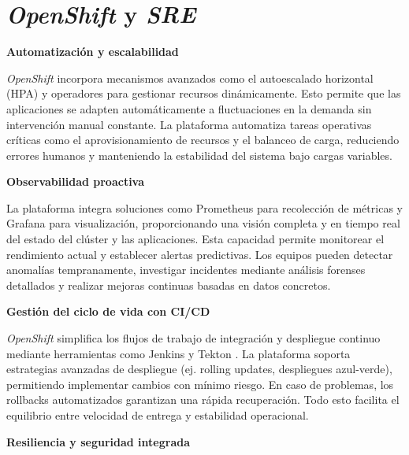 \newpage
\section{\textit{OpenShift} y \textit{SRE}}

\vspace{0.5cm}
\noindent\textbf{Automatización y escalabilidad}

\textit{OpenShift} incorpora mecanismos avanzados como el autoescalado horizontal (HPA) y operadores para gestionar recursos dinámicamente. Esto permite que las aplicaciones se adapten automáticamente a fluctuaciones en la demanda sin intervención manual constante. La plataforma automatiza tareas operativas críticas como el aprovisionamiento de recursos y el balanceo de carga, reduciendo errores humanos y manteniendo la estabilidad del sistema bajo cargas variables.

\vspace{0.5cm}
\noindent\textbf{Observabilidad proactiva}

La plataforma integra soluciones como Prometheus \cite{ref63} para recolección de métricas y Grafana para visualización, proporcionando una visión completa y en tiempo real del estado del clúster y las aplicaciones. Esta capacidad permite monitorear el rendimiento actual y establecer alertas predictivas. Los equipos pueden detectar anomalías tempranamente, investigar incidentes mediante análisis forenses detallados y realizar mejoras continuas basadas en datos concretos.

\vspace{0.5cm}
\noindent\textbf{Gestión del ciclo de vida con CI/CD}

\textit{OpenShift} simplifica los flujos de trabajo de integración y despliegue continuo mediante herramientas como Jenkins \cite{ref64} y Tekton \cite{ref65}. La plataforma soporta estrategias avanzadas de despliegue (ej. rolling updates, despliegues azul-verde), permitiendo implementar cambios con mínimo riesgo. En caso de problemas, los rollbacks automatizados garantizan una rápida recuperación. Todo esto facilita el equilibrio entre velocidad de entrega y estabilidad operacional.

\vspace{0.5cm}
\noindent\textbf{Resiliencia y seguridad integrada}

